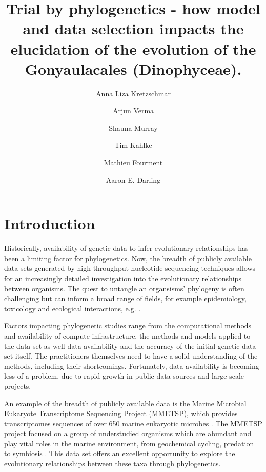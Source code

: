 \documentclass[fleqn,10pt,lineno]{wlpeerj} %
\title{Trial by phylogenetics - how model and data selection impacts the elucidation of the evolution of the Gonyaulacales (Dinophyceae).}
\author[1]{Anna Liza Kretzschmar}
\author[2]{Arjun Verma}
\author[2]{Shauna Murray}
\author[2]{Tim Kahlke}
\author[1]{Mathieu Fourment}
\author[1]{Aaron E. Darling}
\affil[1]{The ithree institute, University of Technology Sydney, Australia}
\affil[2]{c3, University of Technology Sydney, Australia}
\begin{document}
\flushbottom
\maketitle
\thispagestyle{empty}



\section*{Introduction}
Historically, availability of genetic data to infer evolutionary relationships has been a limiting factor for phylogenetics.
Now, the breadth of publicly available data sets generated by high throughput nucleotide sequencing techniques allows for an increasingly detailed investigation into the evolutionary relationships between organisms.
The quest to untangle an organsisms' phylogeny is often challenging but can inform a broad range of fields, for example epidemiology, toxicology and ecological interactions, e.g. \citep{mctavish2017and,lewis2008episodic,mutreja2011evidence,cavender2009merging,sites2011phylogenetic}.

Factors impacting phylogenetic studies range from the computational methods and availability of compute infrastructure, the methods and models applied to the data set as well data availability and the accuracy of the initial genetic data set itself.
The practitioners themselves need to have a solid understanding of the methods, including their shortcomings.
Fortunately, data availability is becoming less of a problem, due to rapid growth in public data sources and large scale projects.

An example of the breadth of publicly available data is the Marine Microbial Eukaryote Transcriptome Sequencing Project (MMETSP), which provides transcriptomes sequences of over 650 marine eukaryotic microbes \citep{keeling2014marine}. 
The MMETSP project focused on a group of understudied organisms which are abundant and play vital roles in the marine environment, from geochemical cycling, predation to symbiosis \citep{gomez2005list,gomez2012quantitative}. 
This data set offers an excellent opportunity to explore the evolutionary relationships between these taxa through phylogenetics. 
\end{document}
